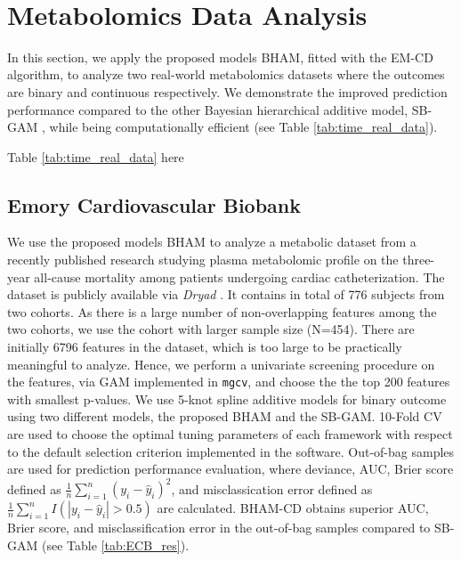 \documentclass[AMA,STIX1COL,]{WileyNJD-v2}
\begin{document}
~

\hypertarget{metabolomics-data-analysis}{%
\section{Metabolomics Data Analysis}\label{metabolomics-data-analysis}}

\label{sec:real_data}

In this section, we apply the proposed models BHAM, fitted with the
EM-CD algorithm, to analyze two real-world metabolomics datasets where
the outcomes are binary and continuous respectively. We demonstrate the
improved prediction performance compared to the other Bayesian
hierarchical additive model, SB-GAM \citep{Bai2021}, while being
computationally efficient (see Table \ref{tab:time_real_data}).

\begin{center}
Table \ref{tab:time_real_data} here
\end{center}

\hypertarget{emory-cardiovascular-biobank}{%
\subsection{Emory Cardiovascular
Biobank}\label{emory-cardiovascular-biobank}}

\label{sec:ECB} We use the proposed models BHAM to analyze a metabolic
dataset from a recently published research \citep{Mehta2020} studying
plasma metabolomic profile on the three-year all-cause mortality among
patients undergoing cardiac catheterization. The dataset is publicly
available via \textit{Dryad} \citep{Mehta2020_data}. It contains in
total of 776 subjects from two cohorts. As there is a large number of
non-overlapping features among the two cohorts, we use the cohort with
larger sample size (N=454). There are initially 6796 features in the
dataset, which is too large to be practically meaningful to analyze.
Hence, we perform a univariate screening procedure on the features, via
GAM implemented in \texttt{mgcv}, and choose the the top 200 features
with smallest p-values. We use 5-knot spline additive models for binary
outcome using two different models, the proposed BHAM and the SB-GAM.
10-Fold CV are used to choose the optimal tuning parameters of each
framework with respect to the default selection criterion implemented in
the software. Out-of-bag samples are used for prediction performance
evaluation, where deviance, AUC, Brier score defined as
\(\frac{1}{n}\sum\limits^{n}_{i=1}(y_i - \hat y_i)^2\), and
misclassication error defined as
\(\frac{1}{n}\sum\limits^{n}_{i=1}I(|y_i - \hat y_i|>0.5)\) are
calculated. BHAM-CD obtains superior AUC, Brier score, and
misclassification error in the out-of-bag samples compared to SB-GAM
(see Table \ref{tab:ECB_res}).
\end{document}
